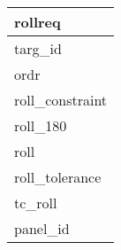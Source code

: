 \documentclass{article}
\begin{document}

\begin{tabular}{|l|} \hline
\textbf{rollreq} \\ \hline
targ\_id \\ \hline
ordr \\ \hline
roll\_constraint \\ \hline
roll\_180 \\ \hline
roll \\ \hline
roll\_tolerance \\ \hline
tc\_roll \\ \hline
panel\_id \\ \hline
\end{tabular}
\end{document}
